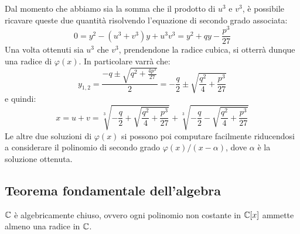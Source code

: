 \documentclass[11pt]{scrartcl}
\begin{document}
	
	Dal momento che abbiamo sia la somma che il prodotto di $u^3$ e $v^3$, è possibile
	ricavare queste due quantità risolvendo l'equazione di secondo grado
	associata:
	\[ 0 = y^2 - (u^3 + v^3) y + u^3 v^3 = y^2 + q y - \frac{p^3}{27} \]
	Una volta ottenuti sia $u^3$ che $v^3$, prendendone la radice cubica, si
	otterrà dunque una radice di $\varphi(x)$. In particolare varrà che:
	\[ y_{1,2} = \frac{-q \pm \sqrt{q^2 + \frac{4p^3}{27}}}{2} = -\frac{q}{2} \pm \sqrt{\frac{q^2}{4} + \frac{p^3}{27}} \]
	e quindi:
	\[ x = u + v = \sqrt[3]{-\frac{q}{2} + \sqrt{\frac{q^2}{4} + \frac{p^3}{27}}} + \sqrt[3]{-\frac{q}{2} - \sqrt{\frac{q^2}{4} + \frac{p^3}{27}}} \]
	Le altre due soluzioni di $\varphi(x)$ si possono poi computare facilmente riducendosi
	a considerare il polinomio di secondo grado $\varphi(x) / (x-\alpha)$, dove $\alpha$ è la soluzione
	ottenuta.
	
	\newpage
	\subsection{Teorema fondamentale dell'algebra}
	\begin{theorem}
		$\mathbb C$ è algebricamente chiuso, ovvero ogni polinomio non costante in $\mathbb C[x]$ ammette almeno una radice in $\mathbb C$.
	\end{theorem}
	
\end{document}
